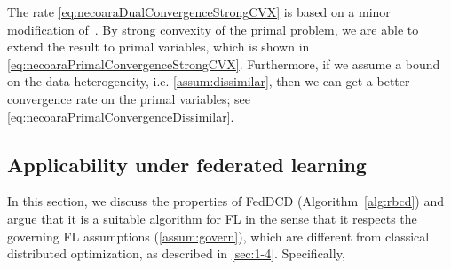 The rate \eqref{eq:necoaraDualConvergenceStrongCVX} is based on a minor modification of~\citet[Theorem~3.1]{necoara2017random}. By strong convexity of the primal problem, we are able to extend the result to primal variables, which is shown in \eqref{eq:necoaraPrimalConvergenceStrongCVX}. Furthermore, if we assume a bound on the data heterogeneity, i.e. \autoref{assum:dissimilar}, then we can get a better convergence rate on the primal variables; see \eqref{eq:necoaraPrimalConvergenceDissimilar}.

\subsection{Applicability under federated learning}
In this section, we discuss the properties of FedDCD (Algorithm~\ref{alg:rbcd}) and argue that it is a suitable algorithm for FL in the sense that it respects the governing FL assumptions (\autoref{assum:govern}), which are different from classical distributed optimization, as described in \autoref{sec:1-4}. Specifically, 
